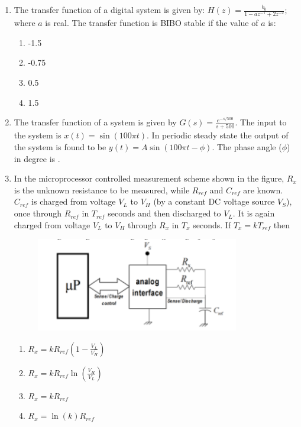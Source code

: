\documentclass[journal,12pt,onecolumn]{IEEEtran}
\theoremstyle{remark}
\begin{document}
\begin{enumerate}
    \item The transfer function of a digital system is given by: $H(z) = \frac{b_0}{1 - az^{-1} + 2z^{-2}}$; where $a$ is real. The transfer function is BIBO stable if the value of $a$ is:
    \begin{multicols}{4}
        \begin{enumerate}
            \item -1.5
            \item -0.75
            \item 0.5
            \item 1.5
        \end{enumerate}
    \end{multicols}

    \item The transfer function of a system is given by $G(s) = \frac{e^{-s/500}}{s+500}$. The input to the system is $x(t) = \sin(100\pi t)$. In periodic steady state the output of the system is found to be $y(t) = A\sin(100\pi t - \phi)$. The phase angle ($\phi$) in degree is \underline{\hspace{2cm}}.

    \vspace{0.5cm}
    
    \item In the microprocessor controlled measurement scheme shown in the figure, $R_x$ is the unknown resistance to be measured, while $R_{ref}$ and $C_{ref}$ are known. $C_{ref}$ is charged from voltage $V_L$ to $V_H$ (by a constant DC voltage source $V_S$), once through $R_{ref}$ in $T_{ref}$ seconds and then discharged to $V_L$. It is again charged from voltage $V_L$ to $V_H$ through $R_x$ in $T_x$ seconds. If $T_x = k T_{ref}$ then
    \begin{figure}[H]
        \centering
        \includegraphics[width=0.6\columnwidth]{q47}
        \caption*{}
        \label{fig:placeholder}
    \end{figure}
    \begin{multicols}{2}
        \begin{enumerate}
            \item $R_x = kR_{ref} (1 - \frac{V_L}{V_H})$
            \item $R_x = kR_{ref} \ln(\frac{V_H}{V_L})$
            \item $R_x = kR_{ref}$
            \item $R_x = \ln(k) R_{ref}$
        \end{enumerate}
    \end{multicols}


\end{enumerate}
\end{document}
